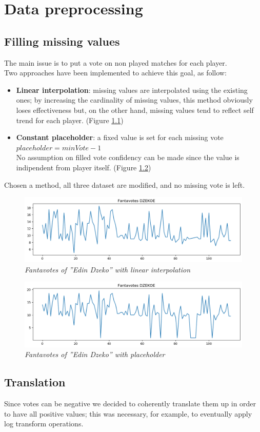 \chapter {Data preprocessing}

\section{Filling missing values}

The main issue is to put a vote on non played matches for each player.
\\
Two approaches have been implemented to achieve this goal, as follow:
\begin{itemize}
\item \textbf{Linear interpolation}: missing values are interpolated using the existing ones; by increasing the cardinality of missing values, this method obviously loses effectiveness but, on the other hand, missing values tend to reflect self trend for each player. (Figure \ref{fig:linear_interpolation})  
\item \textbf{Constant placeholder}: a fixed value is set for each missing vote 
\\
$placeholder = minVote - 1$
\\
No assumption on filled vote confidency can be made since the value is indipendent from player itself. (Figure \ref{fig:placeholder})
\end{itemize}

Chosen a method, all three dataset are modified, and no missing vote is left.

\begin{figure}[H]
  \includegraphics[scale=0.5]{images/dzeko_linear_interpolation_fantavotes.png}
   \centering  
   \caption{\textit{Fantavotes of ''Edin Dzeko'' with \textit{linear interpolation}}}
  \label{fig:linear_interpolation}
\end{figure}

\begin{figure}[H]
  \includegraphics[scale=0.5]{images/dzeko_placeholder_fantavotes.png}
   \centering  
   \caption{\textit{Fantavotes of ''Edin Dzeko'' with \textit{placeholder}}}
  \label{fig:placeholder}
\end{figure}

\section{Translation}
Since votes can be negative we decided to coherently translate them up in order to have all positive values; this was necessary, for example, to eventually apply log transform operations. 

